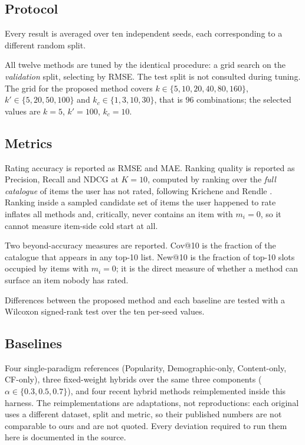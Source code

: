 \documentclass[conference]{IEEEtran}
\begin{document}
\subsection{Protocol}

Every result is averaged over ten independent seeds, each
corresponding to a different random split.

All twelve methods are tuned by the identical procedure: a grid
search on the \emph{validation} split, selecting by RMSE. The test
split is not consulted during tuning. The grid for the proposed
method covers $k \in \{5,10,20,40,80,160\}$,
$k' \in \{5,20,50,100\}$ and $k_c \in \{1,3,10,30\}$, that is $96$
combinations; the selected values are $k=5$, $k'=100$, $k_c=10$.

\subsection{Metrics}

Rating accuracy is reported as RMSE and MAE. Ranking quality is
reported as Precision, Recall and NDCG at $K=10$, computed by ranking
over the \emph{full catalogue} of items the user has not rated,
following Krichene and Rendle \cite{krichene2020}. Ranking inside a
sampled candidate set of items the user happened to rate inflates all
methods and, critically, never contains an item with $m_i = 0$, so
it cannot measure item-side cold start at all.

Two beyond-accuracy measures are reported. Cov@10 is the fraction of
the catalogue that appears in any top-10 list. New@10 is the fraction
of top-10 slots occupied by items with $m_i = 0$; it is the direct
measure of whether a method can surface an item nobody has rated.

Differences between the proposed method and each baseline are tested
with a Wilcoxon signed-rank test over the ten per-seed values.

\subsection{Baselines}

Four single-paradigm references (Popularity, Demographic-only,
Content-only, CF-only), three fixed-weight hybrids over the same
three components ($\alpha \in \{0.3, 0.5, 0.7\}$), and four recent
hybrid methods \cite{tarek2022, do2020, ohwsf2025, slarec2026}
reimplemented inside this harness. The reimplementations are
adaptations, not reproductions: each original uses a different
dataset, split and metric, so their published numbers are not
comparable to ours and are not quoted. Every deviation required to
run them here is documented in the source.
\end{document}
